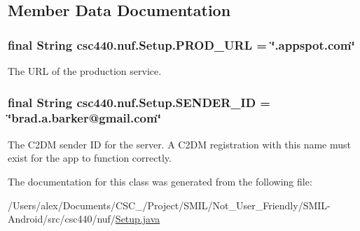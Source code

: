 \subsection{Member Data Documentation}
\hypertarget{classcsc440_1_1nuf_1_1_setup_a2b9dcf3824dfea4980f2d9f8c9bdcf09}{
\subsubsection[{P\-R\-O\-D\-\_\-\-U\-R\-L}]{\setlength{\rightskip}{0pt plus 5cm}final String {\bf csc440.\-nuf.\-Setup.\-P\-R\-O\-D\-\_\-\-U\-R\-L} = \char`\"{}.appspot.\-com\char`\"{}}}\label{classcsc440_1_1nuf_1_1_setup_a2b9dcf3824dfea4980f2d9f8c9bdcf09}
The U\-R\-L of the production service. \hypertarget{classcsc440_1_1nuf_1_1_setup_a7a399cf5d77d0ea94c0cc2a091fc7c7d}{
\subsubsection[{S\-E\-N\-D\-E\-R\-\_\-\-I\-D}]{\setlength{\rightskip}{0pt plus 5cm}final String {\bf csc440.\-nuf.\-Setup.\-S\-E\-N\-D\-E\-R\-\_\-\-I\-D} = \char`\"{}brad.\-a.\-barker@gmail.\-com\char`\"{}}}\label{classcsc440_1_1nuf_1_1_setup_a7a399cf5d77d0ea94c0cc2a091fc7c7d}
The C2\-D\-M sender I\-D for the server. A C2\-D\-M registration with this name must exist for the app to function correctly. 

The documentation for this class was generated from the following file\-:\begin{DoxyCompactItemize}
\item 
/\-Users/alex/\-Documents/\-C\-S\-C\-\_/\-Project/\-S\-M\-I\-L/\-Not\-\_\-\-User\-\_\-\-Friendly/\-S\-M\-I\-L-\/\-Android/src/csc440/nuf/\hyperlink{_setup_8java}{Setup.\-java}\end{DoxyCompactItemize}
